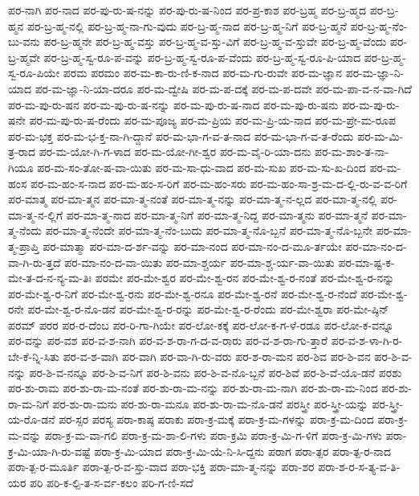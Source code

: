 {ಪರ-ನಾಗಿ
ಪರ-ನಾದ
ಪರ-ಪು-ರು-ಷ-ನನ್ನು
ಪರ-ಪು-ರು-ಷ-ನಿಂದ
ಪರ-ಪ್ರ-ಕಾಶ
ಪರ-ಬ್ರಹ್ಮ
ಪರ-ಬ್ರ-ಹ್ಮದ
ಪರ-ಬ್ರ-ಹ್ಮನ
ಪರ-ಬ್ರ-ಹ್ಮ-ನಲ್ಲಿ
ಪರ-ಬ್ರ-ಹ್ಮ-ನಾ-ಗು-ವುದು
ಪರ-ಬ್ರ-ಹ್ಮ-ನಾದ
ಪರ-ಬ್ರ-ಹ್ಮ-ನಿಗೆ
ಪರ-ಬ್ರ-ಹ್ಮನೆ
ಪರ-ಬ್ರ-ಹ್ಮ-ನೆಂ-ಬು-ವನು
ಪರ-ಬ್ರ-ಹ್ಮನೇ
ಪರ-ಬ್ರ-ಹ್ಮ-ವಸ್ತು
ಪರ-ಬ್ರ-ಹ್ಮ-ವ-ಸ್ತು-ವಿಗೆ
ಪರ-ಬ್ರ-ಹ್ಮ-ವ-ಸ್ತುವೇ
ಪರ-ಬ್ರ-ಹ್ಮ-ವೆಂದು
ಪರ-ಬ್ರ-ಹ್ಮವೇ
ಪರ-ಬ್ರ-ಹ್ಮ-ಸ್ವ-ರೂ-ಪ-ವನ್ನು
ಪರ-ಬ್ರ-ಹ್ಮ-ಸ್ವ-ರೂ-ಪ-ವೆಂದು
ಪರ-ಬ್ರ-ಹ್ಮ-ಸ್ವ-ರೂ-ಪಿ-ಯಾದ
ಪರ-ಬ್ರ-ಹ್ಮ-ಸ್ವ-ರೂ-ಪಿಯೇ
ಪರಮ
ಪರಮಂ
ಪರ-ಮ-ಕಾ-ರು-ಣಿ-ಕ-ನಾದ
ಪರ-ಮ-ಗು-ರುವೇ
ಪರ-ಮ-ಜ್ಞಾನ
ಪರ-ಮ-ಜ್ಞಾ-ನಿ-ಯಾದ
ಪರ-ಮ-ಜ್ಞಾ-ನಿ-ಯಾ-ದರೂ
ಪರ-ಮ-ದ್ವೇಷಿ
ಪರ-ಮ-ಪ-ದಕ್ಕೆ
ಪರ-ಮ-ಪ-ದವೇ
ಪರ-ಮ-ಪಾ-ವ-ನ-ವಾ-ಗಿದೆ
ಪರ-ಮ-ಪು-ರು-ಷನ
ಪರ-ಮ-ಪು-ರು-ಷ-ನನ್ನು
ಪರ-ಮ-ಪು-ರು-ಷ-ನಾದ
ಪರ-ಮ-ಪು-ರು-ಷನು
ಪರ-ಮ-ಪು-ರು-ಷನೇ
ಪರ-ಮ-ಪು-ರು-ಷ-ರೆಂದು
ಪರ-ಮ-ಪೂಜ್ಯ
ಪರ-ಮ-ಪ್ರಿಯ
ಪರ-ಮ-ಪ್ರಿ-ಯ-ನಾದ
ಪರ-ಮ-ಪ್ರೇ-ಮ-ರೂಪ
ಪರ-ಮ-ಭಕ್ತ
ಪರ-ಮ-ಭ-ಕ್ತ-ನಾ-ಗಿ-ದ್ದಾನೆ
ಪರ-ಮ-ಭಾ-ಗ-ವ-ತ-ನಾದ
ಪರ-ಮ-ಭಾ-ಗ-ವ-ತ-ರೆಂದು
ಪರ-ಮ-ಮಿ-ತ್ರ-ರಾದ
ಪರ-ಮ-ಯೋ-ಗಿ-ಗ-ಳಾದ
ಪರ-ಮ-ಯೋ-ಗೀ-ಶ್ವರ
ಪರ-ಮ-ವೈ-ರಿ-ಯಾ-ದನು
ಪರ-ಮ-ಶಾಂ-ತ-ನಾ-ಗಿಯೂ
ಪರ-ಮ-ಸಂ-ತೋ-ಷ-ವಾ-ಯಿತು
ಪರ-ಮ-ಸಾ-ಧು-ವಾದ
ಪರ-ಮ-ಸುಖ
ಪರ-ಮ-ಸು-ಖ-ದಿಂದ
ಪರ-ಮ-ಹಂಸ
ಪರ-ಮ-ಹಂ-ಸ-ನಾದ
ಪರ-ಮ-ಹಂ-ಸ-ರಿಗೆ
ಪರ-ಮ-ಹಂ-ಸರು
ಪರ-ಮ-ಹಂ-ಸಾ-ಶ್ರ-ಮ-ದ-ಲ್ಲಿ-ರು-ವ-ವ-ರಿಗೆ
ಪರ-ಮಾತ್ಮ
ಪರ-ಮಾ-ತ್ಮನ
ಪರ-ಮಾ-ತ್ಮ-ನಂತೆ
ಪರ-ಮಾ-ತ್ಮ-ನನ್ನು
ಪರ-ಮಾ-ತ್ಮ-ನ-ಲ್ಲದ
ಪರ-ಮಾ-ತ್ಮ-ನಲ್ಲಿ
ಪರ-ಮಾ-ತ್ಮ-ನ-ಲ್ಲಿಗೆ
ಪರ-ಮಾ-ತ್ಮ-ನಾದ
ಪರ-ಮಾ-ತ್ಮ-ನಿಗೆ
ಪರ-ಮಾ-ತ್ಮ-ನಿದ್ದ
ಪರ-ಮಾ-ತ್ಮನು
ಪರ-ಮಾ-ತ್ಮನೆ
ಪರ-ಮಾ-ತ್ಮ-ನೆಂದು
ಪರ-ಮಾ-ತ್ಮ-ನೆಂದೇ
ಪರ-ಮಾ-ತ್ಮ-ನೆಂ-ಬುದು
ಪರ-ಮಾ-ತ್ಮ-ನೊ-ಬ್ಬನೆ
ಪರ-ಮಾ-ತ್ಮ-ನೊ-ಬ್ಬನೇ
ಪರ-ಮಾ-ತ್ಮ-ಪ್ರಾಪ್ತಿ
ಪರ-ಮಾತ್ಮಾ
ಪರ-ಮಾ-ದ-ರ್ಶ-ವನ್ನು
ಪರ-ಮಾ-ನಂದ
ಪರ-ಮಾ-ನಂ-ದ-ಮೂ-ರ್ತಯೇ
ಪರ-ಮಾ-ನಂ-ದ-ವಾ-ಗಿ-ರು-ತ್ತದೆ
ಪರ-ಮಾ-ನಂ-ದ-ವಾ-ಯಿತು
ಪರ-ಮಾ-ಶ್ಚರ್ಯ
ಪರ-ಮಾ-ಶ್ಚ-ರ್ಯ-ವಾ-ಯಿತು
ಪರ-ಮಾ-ಷ್ಟ-ಕ-ಮೇ-ತ-ದ-ನ-ನ್ಯ-ಮ-ತಿಃ
ಪರಮೇ
ಪರ-ಮೇ-ಶ್ವರ
ಪರ-ಮೇ-ಶ್ವ-ರನ
ಪರ-ಮೇ-ಶ್ವ-ರ-ನಂತೆ
ಪರ-ಮೇ-ಶ್ವ-ರ-ನನ್ನು
ಪರ-ಮೇ-ಶ್ವ-ರ-ನಿಗೆ
ಪರ-ಮೇ-ಶ್ವ-ರನು
ಪರ-ಮೇ-ಶ್ವ-ರನೂ
ಪರ-ಮೇ-ಶ್ವ-ರನೆ
ಪರ-ಮೇ-ಶ್ವ-ರ-ನೆಂದೆ
ಪರ-ಮೇ-ಶ್ವ-ರನೇ
ಪರ-ಮೇ-ಶ್ವ-ರ-ನೊ-ಡನೆ
ಪರ-ಮೇ-ಶ್ವ-ರ-ರನ್ನು
ಪರ-ಮೇ-ಶ್ವ-ರ-ರೆಂದು
ಪರ-ಮೇ-ಶ್ವರಾ
ಪರ-ಮೇ-ಷ್ಠಿನ್
ಪರಮ್
ಪರರ
ಪರ-ರ-ದೆಂಬ
ಪರ-ರಿ-ಗಾ-ಗಿಯೇ
ಪರ-ಲೋ-ಕಕ್ಕೆ
ಪರ-ಲೋ-ಕ-ಗ-ಳೆ-ರಡೂ
ಪರ-ಲೋ-ಕ-ವನ್ನೂ
ಪರ-ವನ್ನು
ಪರ-ವಶ
ಪರ-ವ-ಶ-ನಾಗಿ
ಪರ-ವ-ಶ-ರಾ-ಗ-ದ-ವ-ರಾರು
ಪರ-ವ-ಶ-ರಾ-ಗು-ತ್ತಾರೆ
ಪರ-ವ-ಶ-ಳಾ-ಗಿ-ರ-ಬೇ-ಕೆ-ನ್ನಿ-ಸಿತು
ಪರ-ವ-ಶ-ವಾಗಿ
ಪರ-ವಾಗಿ
ಪರ-ವಾ-ಗಿ-ರು-ವರು
ಪರ-ಶ-ರಾ-ಮನ
ಪರ-ಶಿವ
ಪರ-ಶಿ-ವನ
ಪರ-ಶಿ-ವ-ನನ್ನು
ಪರ-ಶಿ-ವ-ನನ್ನೂ
ಪರ-ಶಿ-ವ-ನಿಗೆ
ಪರ-ಶಿ-ವನು
ಪರ-ಶಿ-ವ-ನೊ-ಬ್ಬನೆ
ಪರ-ಶಿವೆ
ಪರ-ಶಿ-ವೆ-ಯೊ-ಡನೆ
ಪರಶು
ಪರ-ಶು-ರಾಮ
ಪರ-ಶು-ರಾ-ಮ-ನಂತೆ
ಪರ-ಶು-ರಾ-ಮ-ನನ್ನು
ಪರ-ಶು-ರಾ-ಮ-ನಾಗಿ
ಪರ-ಶು-ರಾ-ಮ-ನಿಂದ
ಪರ-ಶು-ರಾ-ಮ-ನಿಗೆ
ಪರ-ಶು-ರಾ-ಮನು
ಪರ-ಶು-ರಾ-ಮನೂ
ಪರ-ಶು-ರಾ-ಮ-ನೊ-ಡನೆ
ಪರಸ್ತ್ರೀ
ಪರ-ಸ್ತ್ರೀ-ಯನ್ನು
ಪರ-ಸ್ತ್ರೀ-ಯ-ರೊ-ಡನೆ
ಪರ-ಸ್ಪರ
ಪರಸ್ಯ
ಪರಾ-ಕಾಷ್ಠ
ಪರಾಕು
ಪರಾ-ಕ್ರ-ಮಕ್ಕೆ
ಪರಾ-ಕ್ರ-ಮ-ಗಳನ್ನು
ಪರಾ-ಕ್ರ-ಮ-ದಿಂದ
ಪರಾ-ಕ್ರ-ಮ-ವನ್ನು
ಪರಾ-ಕ್ರ-ಮ-ವಾ-ಗಲಿ
ಪರಾ-ಕ್ರ-ಮ-ಶಾ-ಲಿ-ಗಳು
ಪರಾ-ಕ್ರಮಿ
ಪರಾ-ಕ್ರ-ಮಿ-ಗ-ಳಿಗೆ
ಪರಾ-ಕ್ರ-ಮಿ-ಗಳು
ಪರಾ-ಕ್ರ-ಮಿ-ಯಾ-ಗಿ-ರು-ವಷ್ಟೆ
ಪರಾ-ಕ್ರ-ಮಿ-ಯಾದ
ಪರಾ-ಕ್ರ-ಮಿ-ಯೆ-ನಿ-ಸಿ-ದ್ದನು
ಪರಾಗ
ಪರಾ-ತ್ಪರ
ಪರಾ-ತ್ಪ-ರ-ನಾದ
ಪರಾ-ತ್ಪ-ರ-ಮೂರ್ತಿ
ಪರಾ-ತ್ಪ-ರ-ವ-ಸ್ತು-ವಾದ
ಪರಾ-ಭಕ್ತಿ
ಪರಾ-ಮಾ-ತ್ಮ-ನನ್ನು
ಪರಾ-ಶರ
ಪರಾ-ಶ-ರ-ಸ-ತ್ಯ-ವ-ತಿ-ಯರ
ಪರಿ
ಪರಿ-ಕ-ಲ್ಪಿ-ತ-ಸ-ರ್ವ-ಕಲಂ
ಪರಿ-ಗ-ಣಿ-ಸದೆ
}
